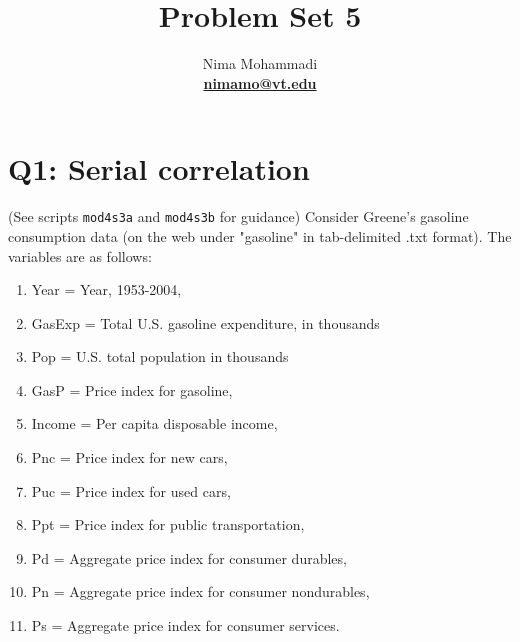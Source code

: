 \documentclass[11pt,reqno]{amsart}\usepackage[]{graphicx}\usepackage[]{color}
\newenvironment{nouppercase}{%
  \let\uppercase\relax%
  \renewcommand{\uppercasenonmath}[1]{}}{}
\begin{document}

\title{Problem Set 5}
\author{Nima Mohammadi \\ \href{mailto:nimamo@vt.edu}{\textbf{nimamo@vt.edu}}} %
\begin{nouppercase}
\maketitle %
\end{nouppercase}








\section{Q1: Serial correlation}
(See scripts \texttt{mod4s3a} and  \texttt{mod4s3b} for guidance) 
Consider Greene's gasoline consumption data (on the web under "gasoline" in tab-delimited .txt  format).  The variables are as follows:
\vspace{0.1in}

\begin{footnotesize}
\begin{enumerate}
\item  Year = Year, 1953-2004, 
\item   GasExp = Total U.S. gasoline expenditure, in thousands
\item   Pop = U.S. total population in thousands 
\item   GasP = Price index for gasoline, 
\item   Income = Per capita disposable income, 
\item   Pnc = Price index for new cars, 
\item   Puc = Price index for used cars, 
\item  Ppt = Price index for public transportation, 
\item   Pd = Aggregate price index for consumer durables, 
\item  Pn = Aggregate price index for consumer nondurables, 
\item  Ps = Aggregate price index for consumer services. 
\end{enumerate}
\end{footnotesize}
\vspace{0.1in}
\end{document}
